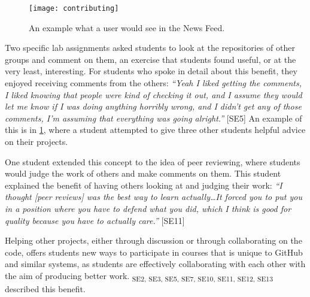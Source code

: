 \begin{figure}[h!]
 \caption{An example what a user would see in the News Feed.}
 \centering
   \texttt{[image: contributing]}
 \label{fig:contributing}
\end{figure}

Two specific lab assignments asked students to look at the repositories of other groups and comment on them, an exercise that students found useful, or at the very least, interesting. For students who spoke in detail about this benefit, they enjoyed receiving comments from the others: \textit{``Yeah I liked getting the comments, I liked knowing that people were kind of checking it out, and I assume they would let me know if I was doing anything horribly wrong, and I didn't get any of those comments, I'm assuming that everything was going alright.''} [SE5] An example of this is in \ref{fig:contributing}, where a student attempted to give three other students helpful advice on their projects.

One student extended this concept to the idea of peer reviewing, where students would judge the work of others and make comments on them. This student explained the benefit of having others looking at and judging their work: \textit{``I thought [peer reviews] was the best way to learn actually\ldots It forced you to put you in a position where you have to defend what you did, which I think is good for quality because you have to actually care.''} [SE11]

Helping other projects, either through discussion or through collaborating on the code, offers students new ways to participate in courses that is unique to GitHub and similar systems, as students are effectively collaborating with each other with the aim of producing better work. \textsubscript{SE2, SE3, SE5, SE7, SE10, SE11, SE12, SE13} described this benefit. \\



